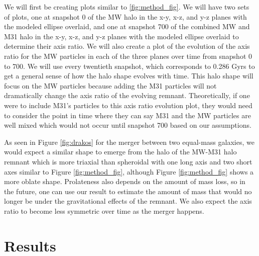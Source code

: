 \documentclass[linenumbers, twocolumn]{aastex631}
\begin{document}
We will first be creating plots similar to \ref{fig:method_fig}. We will have two sets of plots, one at snapshot 0 of the MW halo in the x-y, x-z, and y-z planes with the modeled ellipse overlaid, and one at snapshot 700 of the combined MW and M31 halo in the x-y, x-z, and y-z planes with the modeled ellipse overlaid to determine their axis ratio. We will also create a plot of the evolution of the axis ratio for the MW particles in each of the three planes over time from snapshot 0 to 700. We will use every twentieth snapshot, which corresponds to 0.286 Gyrs to get a general sense of how the halo shape evolves with time. This halo shape will focus on the MW particles because adding the M31 particles will not dramatically change the axis ratio of the evolving remnant. Theoretically, if one were to include M31's particles to this axis ratio evolution plot, they would need to consider the point in time where they can say M31 and the MW particles are well mixed which would not occur until snapshot 700 based on our assumptions. 


As seen in Figure \ref{fig:drakos} for the merger between two equal-mass galaxies, we would expect a similar shape to emerge from the halo of the MW-M31 halo remnant which is more triaxial than spheroidal with one long axis and two short axes similar to Figure \ref{fig:method_fig}, although Figure \ref{fig:method_fig} shows a more oblate shape.
Prolateness also depends on the amount of mass loss, so in the future, one can use our result to estimate the amount of mass that would no longer be under the gravitational effects of the remnant.
We also expect the axis ratio to become less symmetric over time as the merger happens.

\section{Results}
\end{document}
